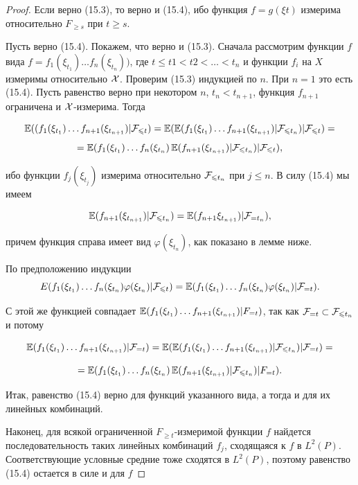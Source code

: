 \begin{proof}
    Если верно (15.3), то верно и (15.4), ибо функция $f = g(\xi t)$ измерима относительно $F_{\geq s}$ при $t \geq s$.

    Пусть верно (15.4). Покажем, что верно и (15.3). Сначала рассмотрим функции $f$ вида $f = f_1(\xi_{t_1})\ldots f_n(\xi_{t_n}))$, где $t \leq t1 < t2 < \ldots < t_n$ и функции $f_i$ на $X$ измеримы относительно $\mathcal{X}$. Проверим (15.3) индукцией по $n$. При $n = 1$ это есть (15.4). Пусть равенство верно при некотором $n$, $t_n < t_{n + 1}$, функция $f_{n+1}$ ограничена и $\mathcal{X}$-измерима. Тогда 
    
    \[ \operatorname{\mathbb{E}}((f_1(\xi_{t_1}) \ldots f_{n+1}(\xi_{t_{n + 1}} )|\mathcal{F}_{\leqslant t}) = \operatorname{\mathbb{E}}(\operatorname{\mathbb{E}}(f_1(\xi_{t_1}) \ldots f_{n + 1}(\xi_{t_{n + 1}})|\mathcal{F}_{\leqslant t_n})|\mathcal{F}_{\leqslant t}) = \]
    \[ = \operatorname{\mathbb{E}}(f_1(\xi_{t_1})\ldots  f_n (\xi_{t_n}) \operatorname{\mathbb{E}} (f_{n + 1}(\xi_{t_{n + 1}} )|\mathcal{F}_{\leqslant t_n})|\mathcal{F}_{\leqslant t}), \]
    
    ибо функции $f_j(\xi_{t_j})$ измерима относительно $\mathcal{F}_{\leqslant t_n}$ при $j \leq n$. В силу (15.4) мы имеем 
    
    \[ \operatorname{\mathbb{E}}(f_{n + 1}(\xi_{t_{n + 1}} )|\mathcal{F}_{\leqslant t_n}) = \operatorname{\mathbb{E}}(f_{n + 1}\xi_{t_{n + 1}} )|\mathcal{F}_{=t_n}), \] 
    
    причем функция справа имеет вид $\varphi(\xi_{t_n})$, как показано в лемме ниже.
    
    По предположению индукции
    \[ E(f_1(\xi_{t_1})\ldots f_n(\xi_{t_n})\varphi(\xi_{t_n})|\mathcal{F}_{\leqslant t}) = \operatorname{\mathbb{E}}(f_1(\xi_{t_1})\ldots f_n(\xi_{t_n})\varphi(\xi_{t_n})|\mathcal{F}_{=t}). \]
    
    С этой же функцией совпадает $\operatorname{\mathbb{E}}(f_1(\xi_{t_1})\ldots f_{n + 1}(\xi_{t_{n + 1}} )|F_{=t})$, так как $\mathcal{F}_{=t} \subset \mathcal{F}_{\leqslant t_n}$ и потому
    
    \[ \operatorname{\mathbb{E}}(f_1(\xi_{t_1})\ldots f_{n + 1}(\xi_{t_{n + 1}} )|\mathcal{F}_{=t})= \operatorname{\mathbb{E}}(\operatorname{\mathbb{E}}(f_1(\xi_{t_1})\ldots f_{n + 1}(\xi_{t_{n + 1}} )|\mathcal{F}_{\leqslant t_n})|\mathcal{F}_{=t}) = \]
    
    \[ = \operatorname{\mathbb{E}}(f_1(\xi_{t_1})\ldots f_n(\xi_{t_n})\operatorname{\mathbb{E}}(f_{n + 1}(\xi_{t_{n + 1}} )|\mathcal{F}_{\leqslant t_n})|F_{=t}). \]
    
    Итак, равенство (15.4) верно для функций указанного вида, а тогда и для их линейных комбинаций.

    Наконец, для всякой ограниченной $F_{\geq t}$-измеримой функции $f$ найдется последовательность таких линейных комбинаций $f_j$, сходящаяся к $f$ в $L^2(P)$. Соответствующие условные средние тоже сходятся в $L^2(P)$, поэтому равенство (15.4) остается в силе и для $f$
\end{proof}

